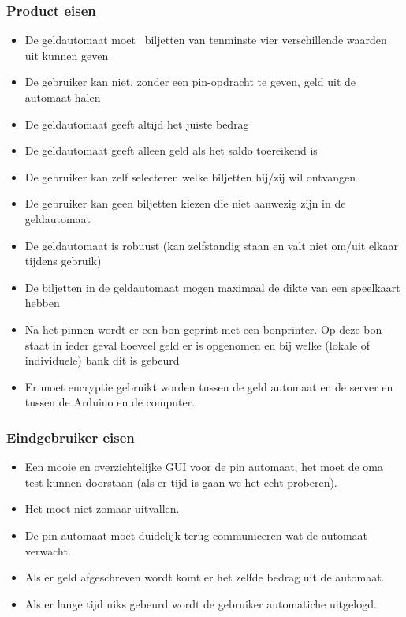 \documentclass{article}
\begin{document}
\subsubsection{Product eisen}
\begin{itemize}
        \item De geldautomaat moet  biljetten van tenminste vier verschillende waarden uit kunnen geven
        \item De gebruiker kan niet, zonder een pin-opdracht te geven, geld uit de automaat halen
        \item De geldautomaat geeft altijd het juiste bedrag
        \item De geldautomaat geeft alleen geld als het saldo toereikend is
        \item De gebruiker kan zelf selecteren welke biljetten hij/zij wil ontvangen
        \item De gebruiker kan geen biljetten kiezen die niet aanwezig zijn in de geldautomaat
        \item De geldautomaat is robuust (kan zelfstandig staan en valt niet om/uit elkaar tijdens gebruik)
        \item De biljetten in de geldautomaat mogen maximaal de dikte van een speelkaart hebben
        \item Na het pinnen wordt er een bon geprint met een bonprinter. Op deze bon staat in ieder geval hoeveel geld er is opgenomen en bij welke (lokale of individuele) bank dit is gebeurd
        \item Er moet encryptie gebruikt worden tussen de geld automaat en de server en tussen de Arduino en de computer.
\end{itemize}

\subsubsection{Eindgebruiker eisen}
\begin{itemize}
        \item Een mooie en overzichtelijke GUI voor de pin automaat, het moet de oma test kunnen doorstaan (als er tijd is gaan we het echt proberen).
        \item Het moet niet zomaar uitvallen.
        \item De pin automaat moet duidelijk terug communiceren wat de automaat verwacht.
        \item Als er geld afgeschreven wordt komt er het zelfde bedrag uit de automaat.
        \item Als er lange tijd niks gebeurd wordt de gebruiker automatiche uitgelogd.
\end{itemize}
\end{document}
